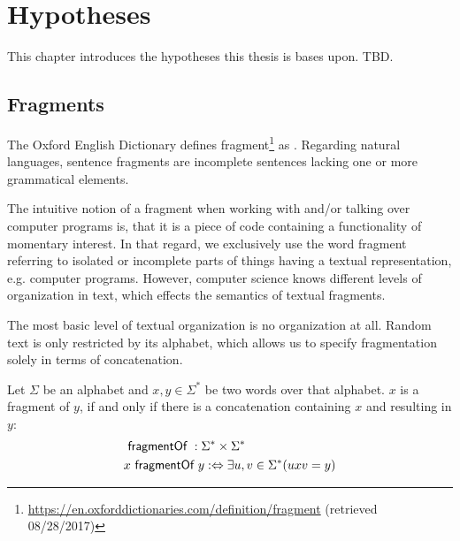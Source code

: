 \chapter{Hypotheses}
\label{chapter:Hypotheses}
This chapter introduces the hypotheses this thesis is bases upon.
TBD.

\section{Fragments}
\label{section:Fragments}
The Oxford English  Dictionary defines fragment\footnote{\url{https://en.oxforddictionaries.com/definition/fragment} (retrieved 08/28/2017)} as .
Regarding natural languages, sentence fragments are incomplete sentences lacking one or more grammatical elements. 

The intuitive notion of a fragment when working with and/or talking over computer programs is, that it is a piece of code containing a functionality of momentary interest.
In that regard, we exclusively use the word fragment referring to isolated or incomplete parts of things having a textual representation, e.g. computer programs.
However, computer science knows different levels of organization in text, which effects the semantics of textual fragments.

The most basic level of textual organization is no organization at all.
Random text is only restricted by its alphabet, which allows us to specify fragmentation solely in terms of concatenation.

\begin{definition}
\label{definition:FragmentsOverAlphabets}
Let $\Sigma$ be an alphabet and $x,y \in \Sigma^\ast$ be two words over that alphabet.
$x$ is a fragment of $y$, if and only if there is a concatenation containing $x$ and resulting in $y$:
\begin{align}
&~\textsf{fragmentOf}~ : \Sigma^\ast \times \Sigma^\ast
\\
&x ~\textsf{fragmentOf}~ y
:\Leftrightarrow
\exists u,v \in \Sigma^\ast (u x v = y)
\end{align}
\end{definition}

